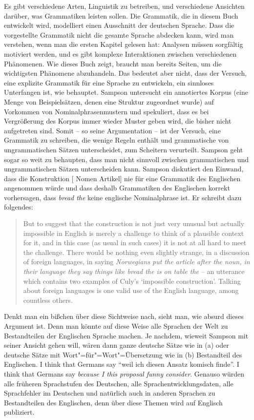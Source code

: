 Es gibt verschiedene Arten, Linguistik zu betreiben, und verschiedene Ansichten darüber,
was Grammatiken leisten sollen. Die Grammatik, die in diesem Buch entwickelt wird,
modelliert einen Ausschnitt der deutschen Sprache. Dass die vorgestellte Grammatik nicht die gesamte
Sprache abdecken kann, wird man verstehen, wenn man die ersten Kapitel gelesen hat:
Analysen müssen sorgfältig motiviert werden, und es gibt komplexe Interaktionen
zwischen verschiedenen Phänomenen. Wie dieses Buch zeigt, braucht man bereits \pageref{last-page-hpsg-teil} Seiten,
um die wichtigsten Phänomene abzuhandeln. Das bedeutet aber nicht, dass der Versuch, eine explizite
Grammatik für eine Sprache zu entwickeln, ein sinnloses Unterfangen ist, wie \zb 
\citet[Kapitel~10]{Sampson2001a-u} behauptet. Sampson untersucht ein annotiertes
Korpus (eine Menge von Beispielsätzen, denen eine Struktur zugeordnet wurde)
auf Vorkommen von Nominalphrasenmustern und spekuliert, dass es bei Vergrößerung des Korpus
immer wieder Muster geben wird, die bisher nicht aufgetreten sind. Somit -- so seine Argumentation --
ist der Versuch, eine Grammatik zu schreiben, die wenige Regeln enthält und grammatische
von ungrammatischen Sätzen unterscheidet, zum Scheitern verurteilt.
Sampson geht sogar so weit zu behaupten, dass man nicht sinnvoll zwischen grammatischen und
ungrammatischen Sätzen unterscheiden kann. Sampson diskutiert den Einwand, dass die Konstruktion
[ Nomen Artikel] nie für eine Grammatik des Englischen angenommen würde und dass deshalb
Grammatiken des Englischen korrekt vorhersagen, dass \emph{bread the} keine englische Nominalphrase ist.
Er schreibt dazu folgendes:
\begin{quote}
But to suggest that the construction is not just very unusual but actually impossible in English
is merely a challenge to think of a plausible context for it, and in this case (as usual in such cases)
it is not at all hard to meet the challenge. There would be nothing even slightly strange, in a discussion
of foreign languages, in saying \emph{Norwegians put the article after the noun, in their language
they say things like bread the is on table the} -- an utterance which contains two examples
of Culy's `impossible construction'. Talking about foreign languages is one valid use of the English
language, among countless others. \citep[]{Sampson2001a-u}
\end{quote}
Denkt man ein bißchen über diese Sichtweise nach, sieht man, wie absurd dieses Argument ist. Denn
man könnte auf diese Weise alle Sprachen der Welt zu Bestandteilen der Englischen Sprache machen.
Je nachdem, wieweit Sampson mit seiner Ansicht gehen will, wären dann \zb ganze deutsche Sätze wie in (a)
oder deutsche Sätze mit Wort"=für"=Wort"=Übersetzung wie in (b) Bestandteil des Englischen.
\eal
\ex I think that Germans say "`weil ich diesen Ansatz komisch finde"'.
\ex I think that Germans say \emph{because I this proposal funny consider}.
\zl
Genauso würden alle früheren Sprachstufen des Deutschen, alle Sprachentwicklungsdaten,
alle Sprachfehler im Deutschen und natürlich auch in anderen Sprachen zu Bestandteilen des
Englischen, denn über diese Themen wird auf Englisch publiziert.

